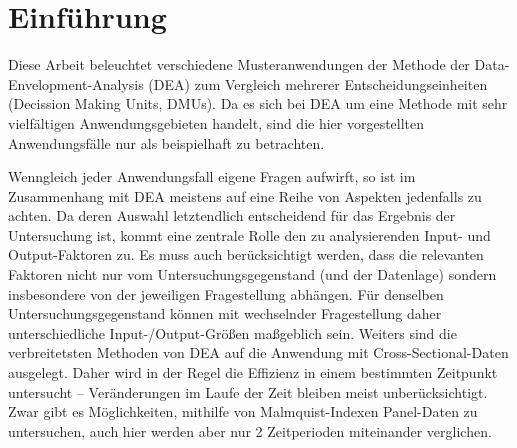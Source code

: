 \section{Einführung}

Diese Arbeit beleuchtet verschiedene Musteranwendungen der Methode der Data-Envelopment-Analysis (DEA) zum Vergleich mehrerer Entscheidungseinheiten (Decission Making Units, DMUs).
Da es sich bei DEA um eine Methode mit sehr vielfältigen Anwendungsgebieten handelt, sind die hier vorgestellten Anwendungsfälle nur als beispielhaft zu betrachten.

Wenngleich jeder Anwendungsfall eigene Fragen aufwirft, so ist im Zusammenhang mit DEA meistens auf eine Reihe von Aspekten jedenfalls zu achten.
Da deren Auswahl letztendlich entscheidend für das Ergebnis der Untersuchung ist, kommt eine zentrale Rolle den zu analysierenden Input- und Output-Faktoren zu.
Es muss auch berücksichtigt werden, dass die relevanten Faktoren nicht nur vom Untersuchungsgegenstand (und der Datenlage) sondern insbesondere von der jeweiligen Fragestellung abhängen.
Für denselben Untersuchungsgegenstand können mit wechselnder Fragestellung daher unterschiedliche Input-/Output-Größen maßgeblich sein.
Weiters sind die verbreitetsten Methoden von DEA auf die Anwendung mit Cross-Sectional-Daten ausgelegt.
Daher wird in der Regel die Effizienz in einem bestimmten Zeitpunkt untersucht -- Veränderungen im Laufe der Zeit bleiben meist unberücksichtigt.
Zwar gibt es Möglichkeiten, mithilfe von Malmquist-Indexen Panel-Daten zu untersuchen, auch hier werden aber nur 2 Zeitperioden miteinander verglichen.

